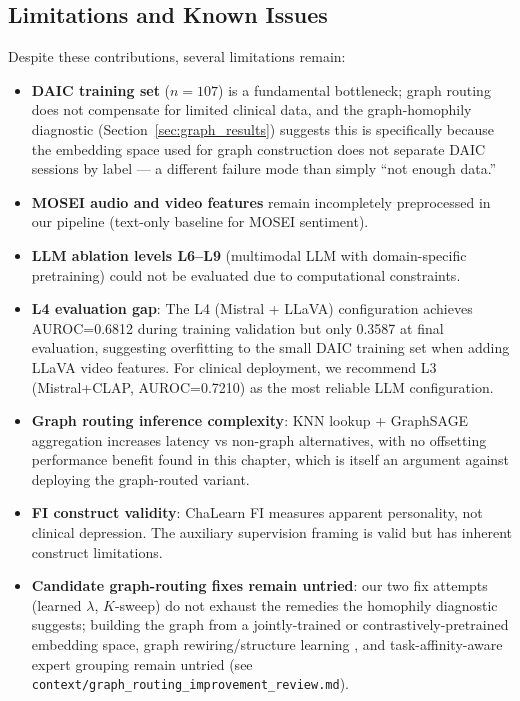 \documentclass[12pt,oneside]{book}
\begin{document}
\subsection{Limitations and Known Issues}

Despite these contributions, several limitations remain:

\begin{itemize}
    \item \textbf{DAIC training set} ($n=107$) is a fundamental bottleneck; graph routing does not compensate for limited clinical data, and the graph-homophily diagnostic (Section~\ref{sec:graph_results}) suggests this is specifically because the embedding space used for graph construction does not separate DAIC sessions by label — a different failure mode than simply ``not enough data.''
    \item \textbf{MOSEI audio and video features} remain incompletely preprocessed in our pipeline (text-only baseline for MOSEI sentiment).
    \item \textbf{LLM ablation levels L6--L9} (multimodal LLM with domain-specific pretraining) could not be evaluated due to computational constraints.
    \item \textbf{L4 evaluation gap}: The L4 (Mistral + LLaVA) configuration achieves AUROC=0.6812 during training validation but only 0.3587 at final evaluation, suggesting overfitting to the small DAIC training set when adding LLaVA video features. For clinical deployment, we recommend L3 (Mistral+CLAP, AUROC=0.7210) as the most reliable LLM configuration.
    \item \textbf{Graph routing inference complexity}: KNN lookup + GraphSAGE aggregation increases latency vs non-graph alternatives, with no offsetting performance benefit found in this chapter, which is itself an argument against deploying the graph-routed variant.
    \item \textbf{FI construct validity}: ChaLearn FI measures apparent personality, not clinical depression. The auxiliary supervision framing is valid but has inherent construct limitations.
    \item \textbf{Candidate graph-routing fixes remain untried}: our two fix attempts (learned $\lambda$, $K$-sweep) do not exhaust the remedies the homophily diagnostic suggests; building the graph from a jointly-trained or contrastively-pretrained embedding space, graph rewiring/structure learning \citep{attali2026graphrewiring}, and task-affinity-aware expert grouping \citep{li2023boosting} remain untried (see \texttt{context/graph\_routing\_improvement\_review.md}).
\end{itemize}
\end{document}
